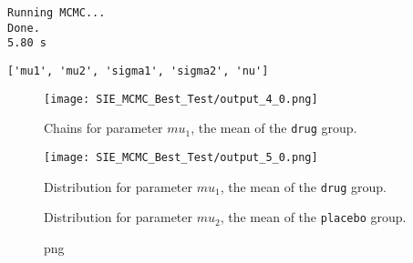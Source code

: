 \begin{Shaded}
\begin{Highlighting}[]
\end{Highlighting}
\end{Shaded}

\begin{verbatim}
Running MCMC...
Done.
5.80 s
\end{verbatim}

\begin{Shaded}
\begin{Highlighting}[]
\end{Highlighting}
\end{Shaded}

\begin{verbatim}
['mu1', 'mu2', 'sigma1', 'sigma2', 'nu']
\end{verbatim}

\begin{Shaded}
\begin{Highlighting}[]
\NormalTok{)}
\end{Highlighting}
\end{Shaded}

\begin{figure}[htbp]
\centering
\texttt{[image: SIE\_MCMC\_Best\_Test/output\_4\_0.png]}
\caption{Chains for parameter $mu_{1}$, the mean of the {\tt drug} group.}
\end{figure}

\begin{Shaded}
\begin{Highlighting}[]
\NormalTok{)}
\end{Highlighting}
\end{Shaded}

\begin{figure}[htbp]
\centering
\texttt{[image: SIE\_MCMC\_Best\_Test/output\_5\_0.png]}
\caption{Distribution for parameter $mu_{1}$, the mean of the {\tt drug} group.}
\end{figure}

\begin{Shaded}
\begin{Highlighting}[]
\NormalTok{)}
\end{Highlighting}
\end{Shaded}

\begin{figure}[htbp]
\centering
\caption{Distribution for parameter $mu_{2}$, the mean of the {\tt placebo} group.}
\caption{png}
\end{figure}

